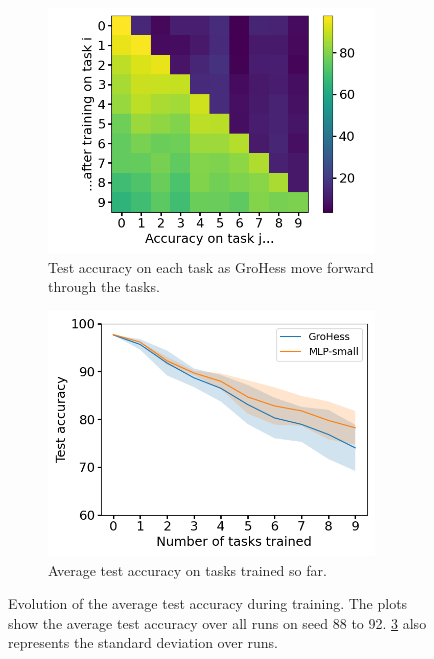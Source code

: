 \documentclass[11pt]{article}
\begin{document}
\begin{figure}
    \centering
    \begin{subfigure}[b]{0.35\textwidth}
        \centering
        \includegraphics[width=0.95\textwidth]{images/accs_matrix.png}
        \caption{Test accuracy on each task as GroHess move forward through the tasks.}
        \label{fig:test_accs_matrix}
    \end{subfigure}
    \hspace{-0mm}
    \begin{subfigure}[b]{0.35\textwidth}
        \centering
        \includegraphics[width=0.95\textwidth]{images/agg_avg_acc_curve.png}
        \caption{Average test accuracy on tasks trained so far.}
        \label{fig:classic_plot}
    \end{subfigure}
    \caption{Evolution of the average test accuracy during training. The plots show the average test accuracy over all runs on seed 88 to 92. \ref{fig:classic_plot} also represents the standard deviation over runs.}
\end{figure}
\end{document}
